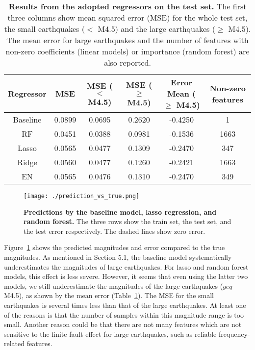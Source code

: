 \documentclass{article} %
\begin{document}
\begin{table}[htbp]
	\small
	\centering
	\begin{tabular}{@{}|c|c|c|c|c|c|@{}} %
		\hline
		\cline{2-4}
		Regressor & MSE & MSE ($<$ M4.5) & MSE ($\geq$ M4.5) & Error Mean ($\geq$ M4.5) & Non-zero features\\ \hline \hline
		Baseline & 0.0899 & 0.0695 & 0.2620 & -0.4250  & 1 \\
		RF & 0.0451 & 0.0388 & 0.0981 & -0.1536 & 1663 \\ 
		Lasso &  0.0565 & 0.0477 & 0.1309 & -0.2470 & 347 \\ 
		Ridge & 0.0560 & 0.0477 & 0.1260 & -0.2421 & 1663 \\ 
		EN & 0.0565 & 0.0476 & 0.1310 & -0.2470 & 349 \\ \hline
	\end{tabular}
	\caption{{\bf Results from the adopted regressors on the test set.} The first three columns show mean squared error (MSE) for the whole test set, the small earthquakes ($<$ M4.5) and the large earthquakes ($\geq$ M4.5). The mean error for large earthquakes and the number of features with non-zero coefficients (linear models) or importance (random forest) are also reported.}
	\label{tab1}
\end{table}

\begin{figure}[ht!]
	\centering
	\texttt{[image: ./prediction\_vs\_true.png]}
	\caption{{\bf Predictions by the baseline model, lasso regression, and random forest.} The three rows show the train set, the test set, and the test error respectively. The dashed lines show zero error.}\label{prediction_vs_true} 
\end{figure}

Figure~\ref{prediction_vs_true} shows the predicted magnitudes and error compared to the true magnitudes. As mentioned in Section 5.1, the baseline model systematically underestimates the magnitudes of large earthquakes. For lasso and random forest models, this effect is less severe. However, it seems that even using the latter two models, we still underestimate the magnitudes of the large earthquakes ($geq$ M4.5), as shown by the mean error (Table~\ref{tab1}). The MSE for the small earthquakes is several times less than that of the large earthquakes. At least one of the reasons is that the number of samples within this magnitude range is too small. Another reason could be that there are not many features which are not sensitive to the finite fault effect for large earthquakes, such as reliable frequency-related features.      
\end{document}

